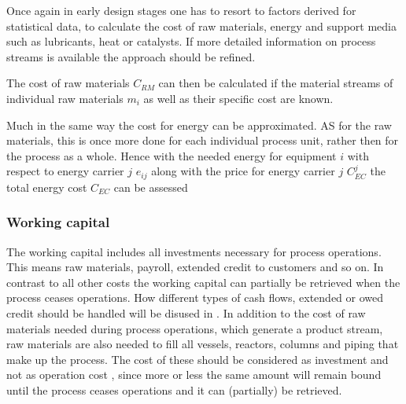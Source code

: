         Once again in early design stages one has to resort to factors derived for statistical data, to calculate
        the cost of raw materials, energy and support media such as lubricants, heat or catalysts. If more
        detailed information on process streams is available the approach should be refined.

        The cost of raw materials $C_{RM}$ can then be calculated if the material streams of individual raw materials
        $m_i$ as well as their specific cost are known.

        Much in the same way the cost for energy can be approximated. AS for the raw materials, this is once 
        more done for each individual process unit, rather then for the process as a whole. Hence
        with the needed energy for equipment $i$ with respect to energy carrier $j$ $e_{ij}$ along with
        the price for energy carrier $j$ $C_{EC}^j$ the total energy cost $C_{EC}$ can be assessed

    \subsubsection{Working capital}
        The working capital includes all investments necessary for process operations. This means raw
        materials, payroll, extended credit to customers and so on. In contrast to all other costs the
        working capital can partially be retrieved when the process ceases operations. How different
        types of cash flows, extended or owed credit should be handled will be disused in
        . In addition to the cost of raw materials needed during process
        operations, which generate a product stream, raw materials are also needed to fill all vessels, reactors,
        columns and piping that make up the process. The cost of these should be considered as investment
        and not as operation cost \cite{Coulson.1999}, since more or less the same amount will remain bound until
        the process ceases operations and it can (partially) be retrieved.

